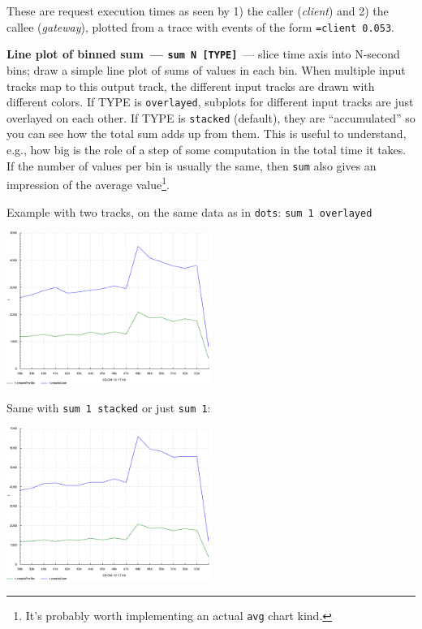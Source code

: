 \documentclass{article}
\begin{document}
These are request execution times as seen by 1) the caller (\emph{client}) and 2) the callee (\emph{gateway}), plotted from a trace with events of the form \texttt{=client 0.053}.

\pagebreak
\noindent
\textbf{Line plot of binned sum~--- \texttt{sum N [TYPE]}}~--- slice time axis into N-second bins; draw a simple line plot of sums of values in each bin. When multiple input tracks map to this output track, the different input tracks are drawn with different colors. If TYPE is \texttt{overlayed}, subplots for different input tracks are just overlayed on each other. If TYPE is \texttt{stacked} (default), they are ``accumulated'' so you can see how the total sum adds up from them. This is useful to understand, e.g., how big is the role of a step of some computation in the total time it takes. If the number of values per bin is usually the same, then \texttt{sum} also gives an impression of the average value\footnote{It's probably worth implementing an actual \texttt{avg} chart kind.}.

Example with two tracks, on the same data as in \texttt{dots}: \texttt{sum 1 overlayed}

\centerline{\includegraphics[width=0.5\textwidth]{pics/tplot/sum-create-user-and-profile-overlayed.png}}

Same with \texttt{sum 1 stacked} or just \texttt{sum 1}:

\centerline{\includegraphics[width=0.5\textwidth]{pics/tplot/sum-create-user-and-profile-stacked.png}}
\end{document}
